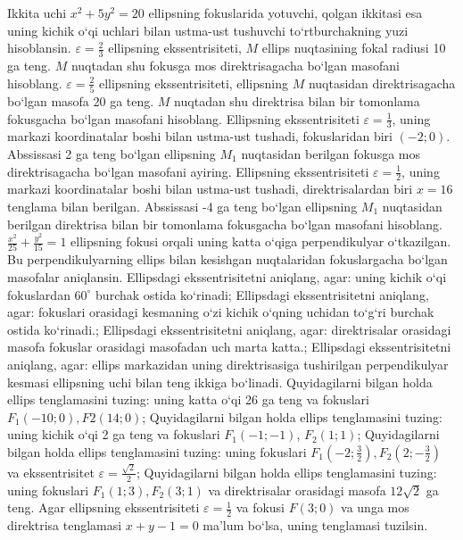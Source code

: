Ikkita uchi $x^2+5 y^2=20$ ellipsning fokuslarida yotuvchi, qolgan ikkitasi esa uning kichik o‘qi uchlari bilan ustma-ust tushuvchi to‘rtburchakning yuzi hisoblansin.
$\varepsilon=\frac{2}{3}$ ellipsning ekssentrisiteti, $M$ ellips nuqtasining fokal radiusi 10 ga teng. $M$ nuqtadan shu fokusga mos direktrisagacha bo‘lgan masofani hisoblang.
$\varepsilon=\frac{2}{5}$ ellipsning ekssentrisiteti, ellipsning $M$ nuqtasidan direktrisagacha bo‘lgan masofa 20 ga teng. $M$ nuqtadan shu direktrisa bilan bir tomonlama fokusgacha bo‘lgan masofani hisoblang.
Ellipsning ekssentrisiteti $\varepsilon=\frac{1}{3}$, uning markazi koordinatalar boshi bilan ustma-ust tushadi, fokuslaridan biri $ (-2; 0) $. Abssissasi 2 ga teng bo‘lgan ellipsning $M_1$ nuqtasidan berilgan fokusga mos direktrisagacha bo‘lgan masofani ayiring.
Ellipsning ekssentrisiteti $\varepsilon=\frac{1}{2}$, uning markazi koordinatalar boshi bilan ustma-ust tushadi, direktrisalardan biri $x=16$ tenglama bilan berilgan. Abssissasi -4 ga teng bo‘lgan ellipsning $M_1$ nuqtasidan berilgan direktrisa bilan bir tomonlama fokusgacha bo‘lgan masofani hisoblang.
$\frac{x^2}{25}+\frac{y^2}{15}=1$ ellipsning fokusi orqali uning katta o‘qiga perpendikulyar o‘tkazilgan. Bu perpendikulyarning ellips bilan kesishgan nuqtalaridan fokuslargacha bo‘lgan masofalar aniqlansin.
Ellipsdagi ekssentrisitetni aniqlang, agar: uning kichik o‘qi fokuslardan $60^{\circ}$ burchak ostida ko‘rinadi;
Ellipsdagi ekssentrisitetni aniqlang, agar: fokuslari orasidagi kesmaning o‘zi kichik o‘qning uchidan to‘g‘ri burchak ostida ko‘rinadi.;
Ellipsdagi ekssentrisitetni aniqlang, agar: direktrisalar orasidagi masofa fokuslar orasidagi masofadan uch marta katta.;
Ellipsdagi ekssentrisitetni aniqlang, agar: ellips markazidan uning direktrisasiga tushirilgan perpendikulyar kesmasi ellipsning uchi bilan teng ikkiga bo‘linadi.
Quyidagilarni bilgan holda ellips tenglamasini tuzing: uning katta o‘qi 26 ga teng va fokuslari $F_1 (-10; 0), F2 (14; 0) $;
Quyidagilarni bilgan holda ellips tenglamasini tuzing: uning kichik o‘qi 2 ga teng va fokuslari $F_1 (-1;-1) $, $F_2 (1; 1) $;
Quyidagilarni bilgan holda ellips tenglamasini tuzing: uning fokuslari $F_1\left(-2; \frac{3}{2}\right), F_2\left(2;-\frac{3}{2}\right) $ va ekssentrisitet $\varepsilon=\frac{\sqrt{2}}{2}$;
Quyidagilarni bilgan holda ellips tenglamasini tuzing: uning fokuslari $F_1 (1; 3), F_2 (3; 1) $ va direktrisalar orasidagi masofa $12 \sqrt{2}$ ga teng.
Agar ellipsning ekssentrisiteti $\varepsilon=\frac{1}{2}$ va fokusi $F(3 ; 0)$ va unga mos direktrisa tenglamasi $x+y-1=0$ ma’lum bo‘lsa, uning tenglamasi tuzilsin.
